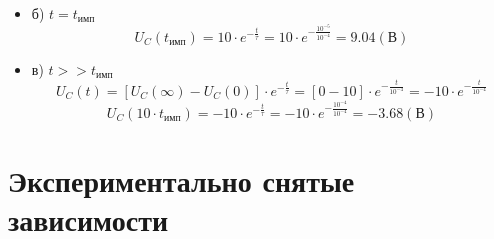 \begin{itemize}
\begin{itemize}
\item[] б) $t = t_\text{имп}$\\
	\begin{equation}
		U_C(t_\text{имп}) = 10 \cdot e^{-\frac{t}{\tau}} = 10 \cdot e^{-\frac{10^{-5}}{10^{-4}}} = 9.04 (\text{В})
	\end{equation}
	
\item[] в) $t >> t_\text{имп}$\\
	\begin{equation}
		U_C(t) = [U_C(\infty) - U_C(0)] \cdot e^{-\frac{t}{\tau}} = [0 - 10] \cdot e^{-\frac{t}{10^{-4}}} = -10 \cdot e^{-\frac{t}{10^{-4}}}
	\end{equation}
	\begin{equation}
		U_C(10 \cdot t_\text{имп}) = -10 \cdot e^{-\frac{t}{\tau}} = -10 \cdot e^{-\frac{10^{-4}}{10^{-4}}} = -3.68 (\text{В})
	\end{equation}
\end{itemize}
\end{itemize}

\section{Экспериментально снятые зависимости}

